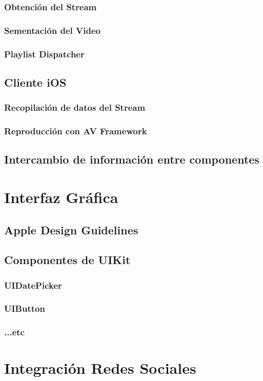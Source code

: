 		\subsubsection{Obtención del Stream}	
		\subsubsection{Sementación del Video}
		\subsubsection{Playlist Dispatcher}
	\subsection{Cliente iOS}
		\subsubsection{Recopilación de datos del Stream}
		\subsubsection{Reproducción con AV Framework}
	\subsection{Intercambio de información entre componentes}
\clearpage
\section{Interfaz Gráfica}
	\subsection{Apple Design Guidelines}
	\subsection{Componentes de UIKit}
		\subsubsection{UIDatePicker}
		\subsubsection{UIButton}
		\subsubsection{...etc}
\clearpage
\section{Integración Redes Sociales}

